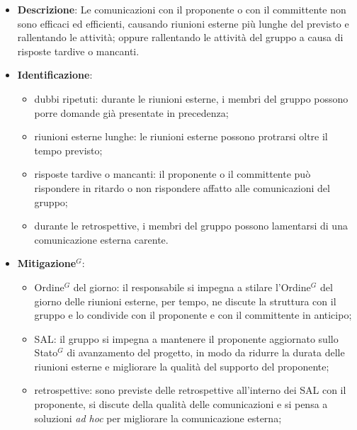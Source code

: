 \label{risk:comunicazione esterna carente}
\begin{itemize}
	\item \textbf{Descrizione}:
	      Le comunicazioni con il proponente o con il committente non sono
	      efficaci ed efficienti, causando riunioni esterne più lunghe del
	      previsto e rallentando le attività; oppure rallentando le attività
	      del gruppo a causa di risposte tardive o mancanti.

	\item \textbf{Identificazione}:
	      \begin{itemize}
		      \item dubbi ripetuti: durante le riunioni esterne, i membri del
		            gruppo possono porre domande già presentate in precedenza;

		      \item riunioni esterne lunghe: le riunioni esterne possono
		            protrarsi oltre il tempo previsto;

		      \item risposte tardive o mancanti: il proponente o il committente
		            può rispondere in ritardo o non rispondere affatto alle
		            comunicazioni del gruppo;

		      \item durante le retrospettive, i membri del gruppo possono
		            lamentarsi di una comunicazione esterna carente.
	      \end{itemize}

	\item \textbf{\gls{Mitigazione}$^G$}:
	      \begin{itemize}
		      \item \gls{Ordine}$^G$ del giorno: il responsabile si impegna a stilare
		            l'\gls{Ordine}$^G$ del giorno delle riunioni esterne, per tempo, ne
		            discute la struttura con il gruppo e lo condivide con il
		            proponente e con il committente in anticipo;

		      \item SAL: il gruppo si impegna a mantenere il
		            proponente aggiornato sullo \gls{Stato}$^G$ di avanzamento del progetto,
		            in modo da ridurre la durata delle riunioni esterne e
		            migliorare la qualità del supporto del proponente;

		      \item retrospettive: sono previste delle retrospettive
		            all'interno dei SAL con il proponente, si discute della
		            qualità delle comunicazioni e si pensa a soluzioni
		            \textit{ad hoc} per migliorare la comunicazione esterna;


\end{itemize}
\end{itemize}

